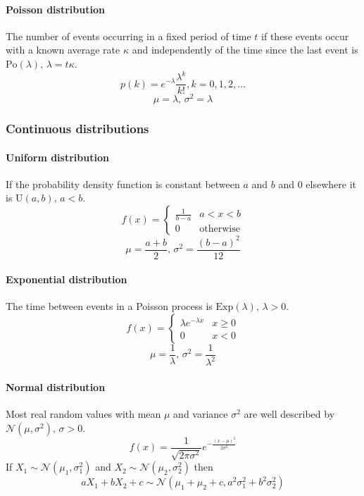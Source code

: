 \paragraph{Poisson distribution}
The number of events occurring in a fixed period of time $t$ if these events occur with a known average rate $\kappa$ and independently of the time since the last event is $\textrm{Po}(\lambda),\,\lambda=t\kappa$.
\[p(k)=e^{-\lambda}\frac{\lambda^k}{k!}, k=0,1,2,\dots\]
\[\mu=\lambda,\,\sigma^2=\lambda\]

\subsubsection{Continuous distributions}

\paragraph{Uniform distribution}
If the probability density function is constant between $a$ and $b$ and 0 elsewhere it is $\textrm{U}(a,b),\,a<b$.
\[f(x) = \left\{
\begin{array}{cl}
\frac{1}{b-a} & a<x<b\\
0 & \textrm{otherwise}
\end{array}\right.\]
\[\mu=\frac{a+b}{2},\,\sigma^2=\frac{(b-a)^2}{12}\]

\paragraph{Exponential distribution}
The time between events in a Poisson process is $\textrm{Exp}(\lambda),\,\lambda>0$.
\[f(x) = \left\{
\begin{array}{cl}
\lambda e^{-\lambda x} & x\geq0\\
0 & x<0
\end{array}\right.\]
\[\mu=\frac{1}{\lambda},\,\sigma^2=\frac{1}{\lambda^2}\]

\paragraph{Normal distribution}
Most real random values with mean $\mu$ and variance $\sigma^2$ are well described by $\mathcal{N}(\mu,\sigma^2),\,\sigma>0$.
\[ f(x) = \frac{1}{\sqrt{2\pi\sigma^2}}e^{-\frac{(x-\mu)^2}{2\sigma^2}} \]
If $X_1 \sim \mathcal{N}(\mu_1,\sigma_1^2)$ and $X_2 \sim \mathcal{N}(\mu_2,\sigma_2^2)$ then
\[ aX_1 + bX_2 + c \sim \mathcal{N}(\mu_1+\mu_2+c,a^2\sigma_1^2+b^2\sigma_2^2) \]

